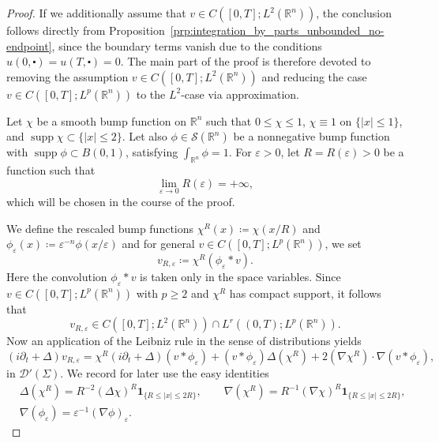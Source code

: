 \documentclass[11pt,a4paper]{amsart}
\theoremstyle{remark}
\theoremstyle{definition}
\DeclareMathOperator{\supp}{supp}
\newcommand{\R}{\mathbb{R}}
\def\ve{\varepsilon}
\def\ind{\mathbf 1}
\def\cd{\centerdot}
\def\d{\partial}
\begin{document}
\begin{proof} If we additionally assume that $v\in C([0,T];L^2(\R^n))$, the conclusion follows directly from Proposition~\ref{prp:integration_by_parts_unbounded_no-endpoint}, since the boundary terms vanish due to the conditions $u(0,\cd)=u(T,\cd)=0$. The main part of the proof is therefore devoted to removing the assumption $v\in C([0,T];L^2(\R^n))$ and reducing the case $v\in C([0,T];L^p(\R^n))$ to the $L^2$-case via approximation.

Let $\chi$ be a smooth bump function on $\R^n$ such that $0\leq \chi \leq 1$, $\chi\equiv 1$ on $\{|x|\leq 1\}$, and $\supp \chi \subset \{|x|\leq 2\}$. Let also $\phi\in \mathcal S(\R^n)$ be a nonnegative bump function with $\supp \phi \subset B(0,1)$, satisfying $\int_{\R^n}\phi=1$. For $\varepsilon>0$, let $R=R(\varepsilon)>0$ be a function such that
\[
\lim_{\varepsilon\to0} R(\varepsilon)=+\infty,
\]
which will be chosen in the course of the proof.

We define the rescaled bump functions $\chi^R(x)\coloneqq \chi(x/R)$ and $\phi_\varepsilon(x)\coloneqq \varepsilon^{-n}\phi(x/\varepsilon)$ and for general $v \in C([0,T];L^p(\R^n))$, we set
\[
v_{R,\varepsilon} \coloneqq \chi^R (\phi_\varepsilon * v).
\]
Here the convolution $\phi_\varepsilon * v$ is taken only in the space variables.  Since $v\in C([0,T];L^p(\R^n))$ with $p\geq 2$ and $\chi^R$ has compact support, it follows that
\[
v_{R,\varepsilon}\in C\left([0,T];L^2(\R^n)\right) \cap L^r\left((0,T);L^p(\R^n)\right).
\]
Now an application of the Leibniz rule in the sense of distributions yields
\begin{equation}\label{eq:Leibniz_distributional}
\left(i \d_t + \Delta \right)v_{R, \ve} = \chi^R \left(i\d_t + \Delta\right)(v*\phi_\ve) +  ( v*\phi_\ve ) \Delta(\chi^R)  + 2 ( \nabla \chi^R ) \cdot \nabla (v*\phi_\ve),
\end{equation}
in $\mathcal{D}' (\Sigma)$. We record for later use the easy identities
\begin{equation}\label{eq:scalederiv}
\begin{split}
& \Delta(\chi^R) = R^{-2} (\Delta \chi)^R \ind_{\{R\leq |x| \leq 2R\}}, \qquad \nabla (\chi^R) = R^{-1} (\nabla \chi)^R \ind_{\{R\leq |x| \leq 2R\}}, 
\\
&  \nabla (\phi_\ve) = \ve^{-1} (\nabla \phi)_{\ve}. 
\end{split}
\end{equation}


\end{proof}
\end{document}
